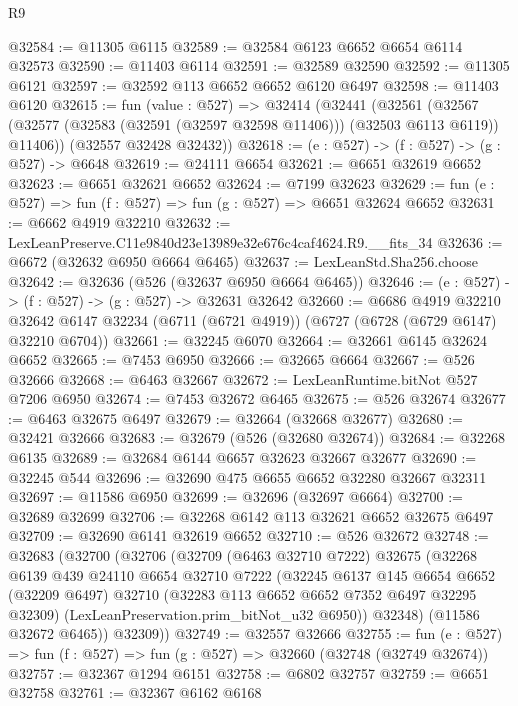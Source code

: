 \begin{lexlean}{R9}
\begin{coremodule}
@32584 := @11305 @6115
@32589 := @32584 @6123 @6652 @6654 @6114 @32573
@32590 := @11403 @6114
@32591 := @32589 @32590
@32592 := @11305 @6121
@32597 := @32592 @113 @6652 @6652 @6120 @6497
@32598 := @11403 @6120
@32615 := fun (value : @527) =>
  @32414
    (@32441
      (@32561
        (@32567 (@32577 (@32583 (@32591 (@32597 @32598 @11406))) (@32503 @6113 @6119)) @11406))
      (@32557 @32428 @32432))
@32618 := (e : @527) -> (f : @527) -> (g : @527) -> @6648
@32619 := @24111 @6654
@32621 := @6651 @32619 @6652
@32623 := @6651 @32621 @6652
@32624 := @7199 @32623
@32629 := fun (e : @527) => fun (f : @527) => fun (g : @527) => @6651 @32624 @6652
@32631 := @6662 @4919 @32210
@32632 := LexLeanPreserve.C11e9840d23e13989e32e676c4caf4624.R9.__fits_34
@32636 := @6672 (@32632 @6950 @6664 @6465)
@32637 := LexLeanStd.Sha256.choose
@32642 := @32636 (@526 (@32637 @6950 @6664 @6465))
@32646 := (e : @527) -> (f : @527) -> (g : @527) -> @32631 @32642
@32660 := @6686
    @4919
    @32210
    @32642
    @6147
    @32234
    (@6711 (@6721 @4919))
    (@6727 (@6728 (@6729 @6147) @32210 @6704))
@32661 := @32245 @6070
@32664 := @32661 @6145 @32624 @6652
@32665 := @7453 @6950
@32666 := @32665 @6664
@32667 := @526 @32666
@32668 := @6463 @32667
@32672 := LexLeanRuntime.bitNot @527 @7206 @6950
@32674 := @7453 @32672 @6465
@32675 := @526 @32674
@32677 := @6463 @32675 @6497
@32679 := @32664 (@32668 @32677)
@32680 := @32421 @32666
@32683 := @32679 (@526 (@32680 @32674))
@32684 := @32268 @6135
@32689 := @32684 @6144 @6657 @32623 @32667 @32677
@32690 := @32245 @544
@32696 := @32690 @475 @6655 @6652 @32280 @32667 @32311
@32697 := @11586 @6950
@32699 := @32696 (@32697 @6664)
@32700 := @32689 @32699
@32706 := @32268 @6142 @113 @32621 @6652 @32675 @6497
@32709 := @32690 @6141 @32619 @6652
@32710 := @526 @32672
@32748 := @32683
    (@32700
      (@32706
        (@32709
          (@6463 @32710 @7222)
          @32675
          (@32268
            @6139
            @439
            @24110
            @6654
            @32710
            @7222
            (@32245
              @6137
              @145
              @6654
              @6652
              (@32209 @6497)
              @32710
              (@32283 @113 @6652 @6652 @7352 @6497 @32295 @32309)
              (LexLeanPreservation.prim_bitNot_u32 @6950))
            @32348)
          (@11586 @32672 @6465))
        @32309))
@32749 := @32557 @32666
@32755 := fun (e : @527) => fun (f : @527) => fun (g : @527) => @32660 (@32748 (@32749 @32674))
@32757 := @32367 @1294 @6151
@32758 := @6802 @32757
@32759 := @6651 @32758
@32761 := @32367 @6162 @6168

\end{coremodule}
\end{lexlean}
